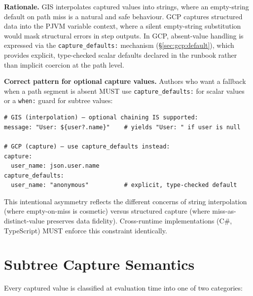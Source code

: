 \noindent\textbf{Rationale.}
GIS interpolates captured values into strings, where an empty-string
default on path miss is a natural and safe behaviour.
GCP captures structured data into the PJVM variable context, where a
silent empty-string substitution would mask structural errors in step
outputs.
In GCP, absent-value handling is expressed via the
\texttt{capture\_defaults:} mechanism (\S\ref{sec:gcp:default}), which
provides explicit, type-checked scalar defaults declared in the runbook
rather than implicit coercion at the path level.

\noindent\textbf{Correct pattern for optional capture values.}
Authors who want a fallback when a path segment is absent MUST use
\texttt{capture\_defaults:} for scalar values or a \texttt{when:} guard
for subtree values:

\begin{verbatim}
# GIS (interpolation) — optional chaining IS supported:
message: "User: ${user?.name}"    # yields "User: " if user is null

# GCP (capture) — use capture_defaults instead:
capture:
  user_name: json.user.name
capture_defaults:
  user_name: "anonymous"          # explicit, type-checked default
\end{verbatim}

This intentional asymmetry reflects the different concerns of string
interpolation (where empty-on-miss is cosmetic) versus structured capture
(where miss-as-distinct-value preserves data fidelity).
Cross-runtime implementations (C\#, TypeScript) MUST enforce this
constraint identically.

\section{Subtree Capture Semantics}
\label{sec:gcp:subtree}

Every captured value is classified at evaluation time into one of two
categories:

